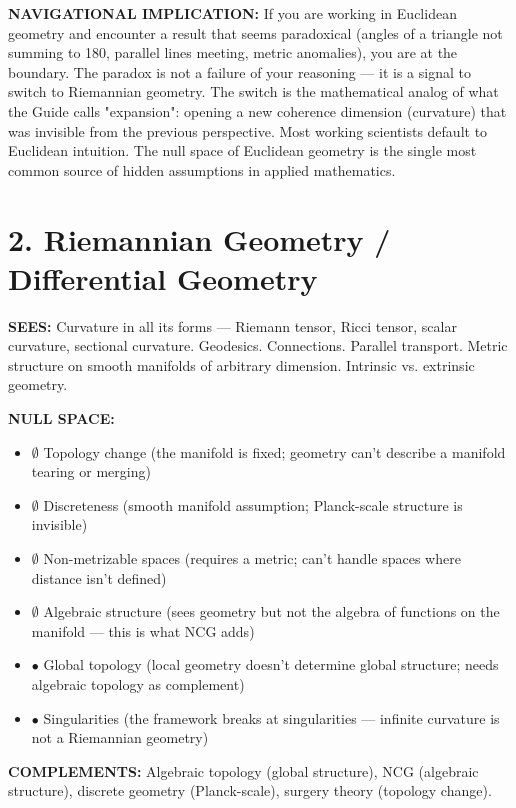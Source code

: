 \textbf{NAVIGATIONAL IMPLICATION:} If you are working in Euclidean geometry and encounter a result that seems paradoxical (angles of a triangle not summing to 180, parallel lines meeting, metric anomalies), you are at the boundary. The paradox is not a failure of your reasoning — it is a signal to switch to Riemannian geometry. The switch is the mathematical analog of what the Guide calls "expansion": opening a new coherence dimension (curvature) that was invisible from the previous perspective. Most working scientists default to Euclidean intuition. The null space of Euclidean geometry is the single most common source of hidden assumptions in applied mathematics.


\bigskip\noindent\makebox[\textwidth]{\color{rulegray}\rule{5cm}{0.3pt}}\bigskip


\section*{2. Riemannian Geometry / Differential Geometry}


\textbf{SEES:} Curvature in all its forms — Riemann tensor, Ricci tensor, scalar curvature, sectional curvature. Geodesics. Connections. Parallel transport. Metric structure on smooth manifolds of arbitrary dimension. Intrinsic vs. extrinsic geometry.


\textbf{NULL SPACE:}

\begin{itemize}[nosep,leftmargin=*]
  \item $\emptyset$ Topology change (the manifold is fixed; geometry can't describe a manifold tearing or merging)
  \item $\emptyset$ Discreteness (smooth manifold assumption; Planck-scale structure is invisible)
  \item $\emptyset$ Non-metrizable spaces (requires a metric; can't handle spaces where distance isn't defined)
  \item $\emptyset$ Algebraic structure (sees geometry but not the algebra of functions on the manifold — this is what NCG adds)
  \item $\bullet$ Global topology (local geometry doesn't determine global structure; needs algebraic topology as complement)
  \item $\bullet$ Singularities (the framework breaks at singularities — infinite curvature is not a Riemannian geometry)
\end{itemize}


\textbf{COMPLEMENTS:} Algebraic topology (global structure), NCG (algebraic structure), discrete geometry (Planck-scale), surgery theory (topology change).


